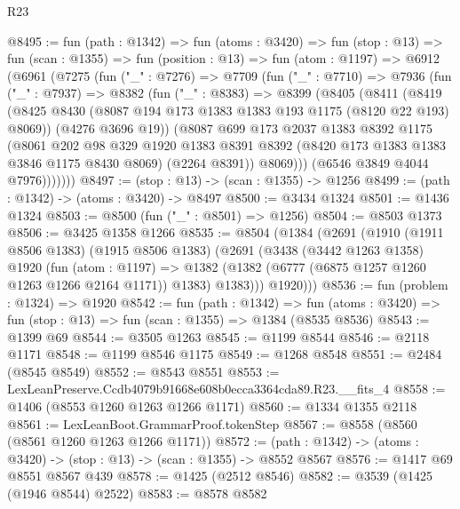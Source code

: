 \begin{lexlean}{R23}
\begin{coremodule}
@8495 := fun (path : @1342) =>
  fun (atoms : @3420) =>
  fun (stop : @13) =>
  fun (scan : @1355) =>
  fun (position : @13) =>
  fun (atom : @1197) =>
  @6912
    (@6961
      (@7275
        (fun ("_" : @7276) =>
        @7709
          (fun ("_" : @7710) =>
          @7936
            (fun ("_" : @7937) =>
            @8382
              (fun ("_" : @8383) =>
              @8399
                (@8405
                  (@8411
                    (@8419
                      (@8425 @8430 (@8087 @194 @173 @1383 @1383 @193 @1175 (@8120 @22 @193) @8069))
                      (@4276 @3696 @19))
                    (@8087
                      @699
                      @173
                      @2037
                      @1383
                      @8392
                      @1175
                      (@8061
                        @202
                        @98
                        @329
                        @1920
                        @1383
                        @8391
                        @8392
                        (@8420 @173 @1383 @1383 @3846 @1175 @8430 @8069)
                        (@2264 @8391))
                      @8069)))
                (@6546 @3849 @4044 @7976)))))))
@8497 := (stop : @13) -> (scan : @1355) -> @1256
@8499 := (path : @1342) -> (atoms : @3420) -> @8497
@8500 := @3434 @1324
@8501 := @1436 @1324
@8503 := @8500 (fun ("_" : @8501) => @1256)
@8504 := @8503 @1373
@8506 := @3425 @1358 @1266
@8535 := @8504
    (@1384
      (@2691
        (@1910
          (@1911 @8506 @1383)
          (@1915 @8506 @1383)
          (@2691
            (@3438
              (@3442 @1263 @1358)
              @1920
              (fun (atom : @1197) =>
              @1382 (@1382 (@6777 (@6875 @1257 @1260 @1263 @1266 @2164 @1171)) @1383) @1383)))
          @1920)))
@8536 := fun (problem : @1324) => @1920
@8542 := fun (path : @1342) =>
  fun (atoms : @3420) => fun (stop : @13) => fun (scan : @1355) => @1384 (@8535 @8536)
@8543 := @1399 @69
@8544 := @3505 @1263
@8545 := @1199 @8544
@8546 := @2118 @1171
@8548 := @1199 @8546 @1175
@8549 := @1268 @8548
@8551 := @2484 (@8545 @8549)
@8552 := @8543 @8551
@8553 := LexLeanPreserve.Ccdb4079b91668e608b0ecca3364cda89.R23.__fits_4
@8558 := @1406 (@8553 @1260 @1263 @1266 @1171)
@8560 := @1334 @1355 @2118
@8561 := LexLeanBoot.GrammarProof.tokenStep
@8567 := @8558 (@8560 (@8561 @1260 @1263 @1266 @1171))
@8572 := (path : @1342) -> (atoms : @3420) -> (stop : @13) -> (scan : @1355) -> @8552 @8567
@8576 := @1417 @69 @8551 @8567 @439
@8578 := @1425 (@2512 @8546)
@8582 := @3539 (@1425 (@1946 @8544) @2522)
@8583 := @8578 @8582

\end{coremodule}
\end{lexlean}
